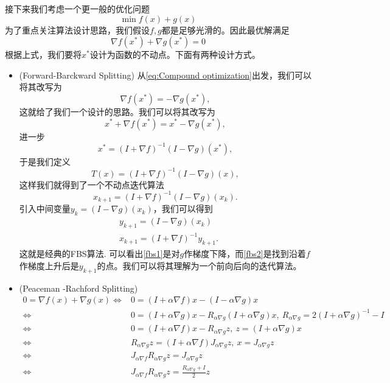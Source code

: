 接下来我们考虑一个更一般的优化问题
\begin{equation}\label{eq:Compound optimization}
\min f(x) + g(x)
\end{equation}
为了重点关注算法设计思路，我们假设$f,g$都是足够光滑的。因此最优解满足
\[
    \nabla f(x^*) + \nabla g(x^*) = 0
\]
根据上式，我们要将$x^*$设计为函数的不动点。下面有两种设计方式。
\begin{itemize}
    \item (Forward-Barckward Splitting) 从\eqref{eq:Compound optimization}出发，我们可以将其改写为
    \[\nabla f(x^*) = -\nabla g(x^*),\]
    这就给了我们一个设计的思路。我们可以将其改写为
    \[
    x^*+\nabla f(x^*) = x^*-\nabla g(x^*),
    \]
    进一步
    \[
    x^* = (I+\nabla f )^{-1}(I-\nabla g)(x^*),
    \]
    于是我们定义
    \[
    T(x) = (I+\nabla f )^{-1}(I-\nabla g)(x),
    \]
    这样我们就得到了一个不动点迭代算法
    \[
    x_{k+1} = (I+\nabla f )^{-1}(I-\nabla g)(x_k).
    \]
    引入中间变量$y_k = (I-\nabla g)(x_k)$，我们可以得到
    \begin{align}
       & y_{k+1} = (I-\nabla g)(x_k)\label{fbs1}\\
        &x_{k+1} = (I+\nabla f )^{-1}y_{k+1}.\label{fbs2}
    \end{align}
    这就是经典的FBS算法. 可以看出\eqref{fbs1}是对$g$作梯度下降，而\eqref{fbs2}是找到沿着$f$作梯度上升后是$y_{k+1}$的点。我们可以将其理解为一个前向后向的迭代算法。
    \item (Peaceman -Rachford Splitting)
    \begin{equation}
        \begin{aligned}
            0=\nabla f(x) + \nabla g(x)\Longleftrightarrow& 0 = (I+\alpha \nabla f)x -(I-\alpha \nabla g)x\\
            \Longleftrightarrow& 0 = (I+\alpha \nabla g)x - R_{\alpha \nabla g}(I+\alpha \nabla g)x, \ R_{\alpha \nabla g}=2(I+\alpha \nabla g)^{-1}-I\\
            \Longleftrightarrow& 0 = (I+\alpha \nabla f)x - R_{\alpha \nabla g}z ,\  z = (I+\alpha \nabla g)x \\
            \Longleftrightarrow& R_{\alpha \nabla g}z = (I+\alpha \nabla f)J_{\alpha \nabla g}z , \ x=J_{\alpha \nabla g}z\\
            \Longleftrightarrow& J_{\alpha\nabla f}R_{\alpha \nabla g}z = J_{\alpha \nabla g}z\\
            \Longleftrightarrow& J_{\alpha\nabla f}R_{\alpha \nabla g}z = \frac{R_{\alpha \nabla g}+I}{2}z\\

\end{aligned}
\end{equation}
\end{itemize}
